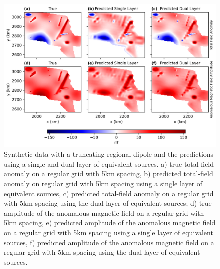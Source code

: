 \begin{figure}[tb!]
\centering
\includegraphics[width=1\linewidth]{figures/truncated_regional.png}
\caption{
    Synthetic data with a truncating regional dipole and the predictions using a single and dual layer of equivalent sources. a) true total-field anomaly on a regular grid with 5km spacing, b) predicted total-field anomaly on regular grid with 5km spacing using a single layer of equivalent sources, c) predicted total-field anomaly on a regular grid with 5km spacing using the dual layer of equivalent sources; d) true amplitude of the anomalous magnetic field on a regular grid with 5km spacing, e) predicted amplitude of the anomalous magnetic field on a regular grid with 5km spacing using a single layer of equivalent sources, f) predicted amplitude of the anomalous magnetic field on a regular grid with 5km spacing using the dual layer of equivalent sources.
}
\label{fig:truncated_regional}
\end{figure}

